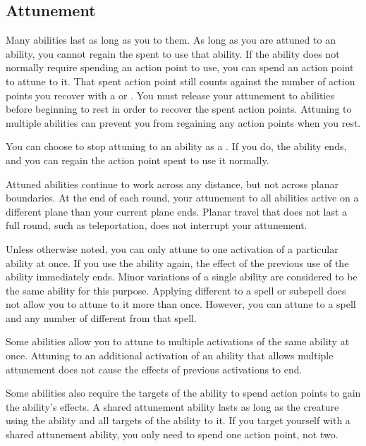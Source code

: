         \subsection{Attunement}\label{Attunement}
            Many abilities last as long as you  to them.
            As long as you are attuned to an ability, you cannot regain the  spent to use that ability.
            If the ability does not normally require spending an action point to use, you can spend an action point to attune to it.
            That spent action point still counts against the number of action points you recover with a  or .
            You must release your attunement to abilities before beginning to rest in order to recover the spent action points.
            Attuning to multiple abilities can prevent you from regaining any action points when you rest.

            You can choose to stop attuning to an ability as a .
            If you do, the ability ends, and you can regain the action point spent to use it normally.

            Attuned abilities continue to work across any distance, but not across planar boundaries.
            At the end of each round, your attunement to all abilities active on a different plane than your current plane ends.
            Planar travel that does not last a full round, such as teleportation, does not interrupt your attunement.

            \label{Multiple Attunement}
                Unless otherwise noted, you can only attune to one activation of a particular ability at once.
                If you use the ability again, the effect of the previous use of the ability immediately ends.
                Minor variations of a single ability are considered to be the same ability for this purpose.
                Applying different  to a spell or subspell does not allow you to attune to it more than once.
                However, you can attune to a spell and any number of different  from that spell.

                Some abilities allow you to attune to multiple activations of the same ability at once.
                Attuning to an additional activation of an ability that allows multiple attunement does not cause the effects of previous activations to end.

            \label{Shared Attunement}
                Some abilities also require the targets of the ability to spend action points to gain the ability's effects.
                A shared attunement ability lasts as long as the creature using the ability and all targets of the ability  to it.
                If you target yourself with a shared attunement ability, you only need to spend one action point, not two.

